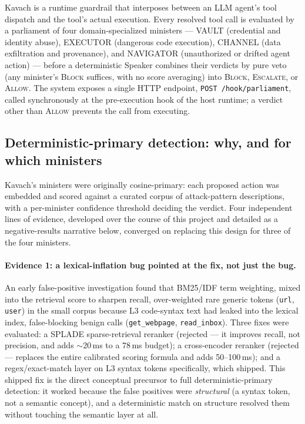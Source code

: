 \documentclass[sigconf,anonymous,review]{acmart}
\begin{document}
Kavach is a runtime guardrail that interposes between an LLM agent's tool
dispatch and the tool's actual execution. Every resolved tool call is
evaluated by a parliament of four domain-specialized ministers --- VAULT
(credential and identity abuse), EXECUTOR (dangerous code execution),
CHANNEL (data exfiltration and provenance), and NAVIGATOR (unauthorized or
drifted agent action) --- before a deterministic Speaker combines their
verdicts by pure veto (any minister's \textsc{Block} suffices, with no score
averaging) into \textsc{Block}, \textsc{Escalate}, or \textsc{Allow}. The
system exposes a
single HTTP endpoint, \texttt{POST /hook\allowbreak/parliament}, called synchronously at
the pre-execution hook of the host runtime; a verdict other than
\textsc{Allow} prevents the call from executing.

\subsection{Deterministic-primary detection: why, and for which ministers}
\label{sec:deterministic-primary}

Kavach's ministers were originally cosine-primary: each proposed action was
embedded and scored against a curated corpus of attack-pattern descriptions,
with a per-minister confidence threshold deciding the verdict. Four
independent lines of evidence, developed over the course of this project and
detailed as a negative-results narrative below, converged on replacing this
design for three of the four ministers.

\paragraph{Evidence 1: a lexical-inflation bug pointed at the fix, not just the
bug.} An early false-positive investigation found that BM25/IDF term
weighting, mixed into the retrieval score to sharpen recall, over-weighted
rare generic tokens (\texttt{url}, \texttt{user}) in the small corpus because
L3 code-syntax text had leaked into the lexical index, false-blocking benign
calls (\texttt{get\_webpage}, \texttt{read\_inbox}). Three fixes were
evaluated: a SPLADE sparse-retrieval reranker (rejected --- it improves
recall, not precision, and adds $\sim$20\,ms to a 78\,ms budget); a
cross-encoder reranker (rejected --- replaces the entire calibrated scoring
formula and adds 50--100\,ms); and a regex/exact-match layer on L3 syntax
tokens specifically, which shipped. This shipped fix is the direct conceptual
precursor to full deterministic-primary detection: it worked because the
false positives were \emph{structural} (a syntax token, not a semantic
concept), and a deterministic match on structure resolved them without
touching the semantic layer at all.
\end{document}
